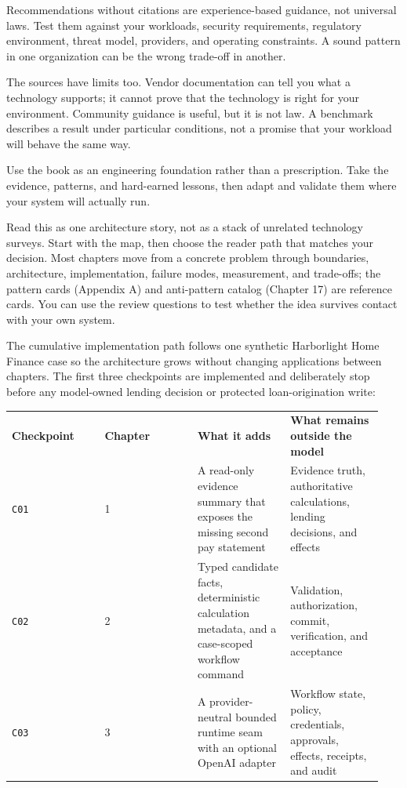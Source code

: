 Recommendations without citations are experience-based guidance, not universal laws. Test them against your workloads, security requirements, regulatory environment, threat model, providers, and operating constraints. A sound pattern in one organization can be the wrong trade-off in another.\par

The sources have limits too. Vendor documentation can tell you what a technology supports; it cannot prove that the technology is right for your environment. Community guidance is useful, but it is not law. A benchmark describes a result under particular conditions, not a promise that your workload will behave the same way.\par

Use the book as an engineering foundation rather than a prescription. Take the evidence, patterns, and hard-earned lessons, then adapt and validate them where your system will actually run.\par


Read this as one architecture story, not as a stack of unrelated technology surveys. Start with the map, then choose the reader path that matches your decision. Most chapters move from a concrete problem through boundaries, architecture, implementation, failure modes, measurement, and trade-offs; the pattern cards (Appendix A) and anti-pattern catalog (Chapter 17) are reference cards. You can use the review questions to test whether the idea survives contact with your own system.\par

The cumulative implementation path follows one synthetic Harborlight Home Finance case so the architecture grows without changing applications between chapters. The first three checkpoints are implemented and deliberately stop before any model-owned lending decision or protected loan-origination write:\par

\BookTableStart
\fontsize{7.2}{9}\selectfont
\begin{tabular}{@{}Y{0.2350\linewidth}Y{0.2350\linewidth}Y{0.2350\linewidth}Y{0.2350\linewidth}@{}}
\color{white}\bfseries Checkpoint & \color{white}\bfseries Chapter & \color{white}\bfseries What it adds & \color{white}\bfseries What remains outside the model \\
\lstinline[style=bookinline]!C01! & 1 & A read-only evidence summary that exposes the missing second pay statement & Evidence truth, authoritative calculations, lending decisions, and effects \\
\lstinline[style=bookinline]!C02! & 2 & Typed candidate facts, deterministic calculation metadata, and a case-scoped workflow command & Validation, authorization, commit, verification, and acceptance \\
\lstinline[style=bookinline]!C03! & 3 & A provider-neutral bounded runtime seam with an optional OpenAI adapter & Workflow state, policy, credentials, approvals, effects, receipts, and audit \\
\end{tabular}
\BookTableEnd

